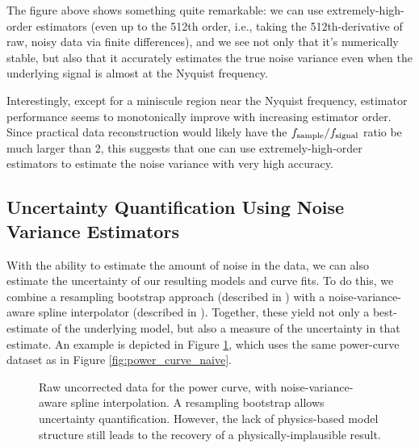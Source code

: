\documentclass[conf]{new-aiaa}
\begin{document}
    The figure above shows something quite remarkable: we can use extremely-high-order estimators (even up to the 512th order, i.e., taking the 512th-derivative of raw, noisy data via finite differences), and we see not only that it's numerically stable, but also that it accurately estimates the true noise variance even when the underlying signal is almost at the Nyquist frequency.

    Interestingly, except for a miniscule region near the Nyquist frequency, estimator performance seems to monotonically improve with increasing estimator order. Since practical data reconstruction would likely have the $f_{\rm sample} / f_{\rm signal}$ ratio be much larger than 2, this suggests that one can use extremely-high-order estimators to estimate the noise variance with very high accuracy.

    \subsection{Uncertainty Quantification Using Noise Variance Estimators}

    With the ability to estimate the amount of noise in the data, we can also estimate the uncertainty of our resulting models and curve fits. To do this, we combine a resampling bootstrap approach (described in \cite{surrogates, elements_of_statistical_learning}) with a noise-variance-aware spline interpolator (described in \cite{surrogates, wahba}). Together, these yield not only a best-estimate of the underlying model, but also a measure of the uncertainty in that estimate. An example is depicted in Figure \ref{fig:power_curve_spline_but_no_physics}, which uses the same power-curve dataset as in Figure \ref{fig:power_curve_naive}.

    \begin{figure}[!htb]
        \centering
        \caption{Raw uncorrected data for the power curve, with noise-variance-aware spline interpolation. A resampling bootstrap allows uncertainty quantification. However, the lack of physics-based model structure still leads to the recovery of a physically-implausible result.}
        \label{fig:power_curve_spline_but_no_physics}
    \end{figure}
\end{document}
